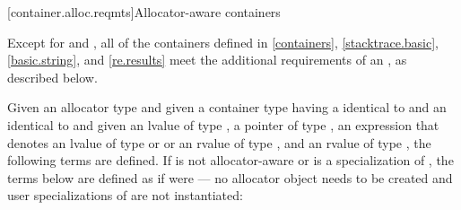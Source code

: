 [container.alloc.reqmts]{Allocator-aware containers}

\pnum
Except for  and ,
all of the containers defined in \ref{containers},
\ref{stacktrace.basic}, \ref{basic.string}, and \ref{re.results}
meet the additional requirements of an ,
as described below.

\pnum
Given an allocator type 
and given a container type  having a  identical to 
and an  identical to 
and given an lvalue  of type ,
a pointer  of type ,
an expression  that denotes
an lvalue of type  or  or
an rvalue of type ,
and an rvalue  of type ,
the following terms are defined. If 
is not allocator-aware or is a specialization of ,
the terms below are defined as if  were
 --- no allocator object needs to be created
and user specializations of  are not instantiated:

